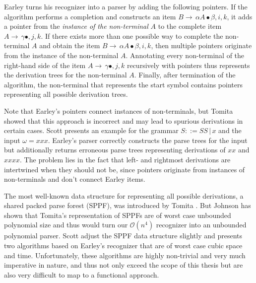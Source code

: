 \begin{isabellebody}
\begin{isamarkuptext}
Earley \cite{Earley:1970} turns his recognizer into a parser by adding the following
pointers. If the algorithm performs a completion and constructs an item $B \rightarrow \, \alpha A \bullet \beta, i, k$,
it adds a pointer from the \textit{instance of the non-terminal} $A$ to the complete item
$A \rightarrow \, \gamma \bullet, j, k$. If there exists more than one possible way to complete the non-terminal
$A$ and obtain the item $B \rightarrow \, \alpha A \bullet \beta, i, k$, then multiple pointers originate
from the instance of the non-terminal $A$. Annotating every non-terminal of the right-hand side of the item
$A \rightarrow \, \gamma \bullet, j, k$ recursively with pointers thus represents the derivation trees for
the non-terminal $A$. Finally, after termination of the algorithm, the non-terminal that represents the start symbol
contains pointers representing all possible derivation trees.

Note that Earley's pointers connect instances of non-terminals, but Tomita \cite{Tomita:1985} showed
that this approach is incorrect and may lead to spurious derivations in certain cases. Scott \cite{Scott:2008}
presents an example for the grammar $S ::= SS \, | \, x$ and the input $\omega = xxx$. Earley's parser
correctly constructs the parse trees for the input but additionally returns erroneous parse trees representing
derivations of $xx$ and $xxxx$. The problem lies in the fact that left- and rightmost derivations are
intertwined when they should not be, since pointers originate from instances of non-terminals and don't
connect Earley items.

The most well-known data structure for representing all possible derivations, a shared packed parse
forest (SPPF), was introduced by Tomita \cite{Tomita:1985}. But Johnson \cite{Johnson:1991} has
shown that Tomita's representation of SPPFs are of worst case unbounded polynomial size and thus
would turn our $\mathcal{O}(n^4)$ recognizer into an unbounded polynomial parser. Scott \cite{Scott:2008}
adjust the SPPF data structure slightly and presents two algorithms based on Earley's recognizer that
are of worst case cubic space and time. Unfortunately, these algorithms are highly non-trivial and
very much imperative in nature, and thus not only exceed the scope of this thesis but are also
very difficult to map to a functional approach.


\end{isamarkuptext}
\end{isabellebody}
